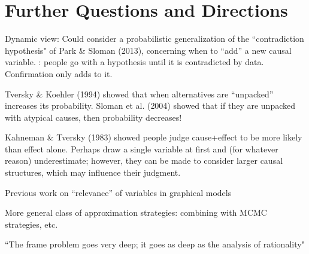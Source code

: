 \documentclass[10pt,letterpaper]{article}
\begin{document}
\section{Further Questions and Directions}

Dynamic view: Could consider a probabilistic generalization of the ``contradiction hypothesis" of Park \& Sloman (2013), concerning when to ``add'' a new causal variable. \cite{KlaymanHa}: people go with a hypothesis until it is contradicted by data. Confirmation only adds to it.

Tversky \& Koehler (1994) showed that when alternatives are ``unpacked'' increases its probability. Sloman et al. (2004) showed that if they are unpacked with atypical causes, then probability decreases!

Kahneman \& Tversky (1983) showed people judge cause+effect to be more likely than effect alone. Perhaps draw a single variable at first and (for whatever reason) underestimate; however, they can be made to consider larger causal structures, which may influence their judgment. 

Previous work on ``relevance'' of variables in graphical models \citep{Druzdzel}


More general class of approximation strategies: combining with MCMC strategies, etc. \citep{WickMcCallum}

``The frame problem goes very deep; it goes as deep as the analysis of rationality" \citep{Fodor1987}




\end{document}
